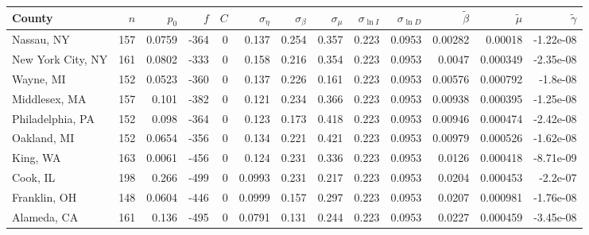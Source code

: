 \documentclass[12pt,letterpaper]{article}
\begin{document}
\begin{appendices}
\begin{sidewaystable}
{\begin{tabular}{lrrrrrrrrrrrr}
\hline
 County             &   $n$ &   $p_0$ &    $f$ &   $C$ &   $\sigma_\eta$ &   $\sigma_\beta$ &   $\sigma_\mu$ &   $\sigma_{\ln I}$ &   $\sigma_{\ln D}$ &   $\tilde{\beta}$ &   $\tilde{\mu}$ &   $\tilde\gamma$ \\
\hline
 Nassau, NY         & 157   & 0.0759  & -364   &     0 &          0.137  &           0.254  &         0.357  &              0.223 &             0.0953 &           0.00282 &        0.00018  &       -1.22e-08  \\
 New York City, NY  & 161   & 0.0802  & -333   &     0 &          0.158  &           0.216  &         0.354  &              0.223 &             0.0953 &           0.0047  &        0.000349 &       -2.35e-08  \\
 Wayne, MI          & 152   & 0.0523  & -360   &     0 &          0.137  &           0.226  &         0.161  &              0.223 &             0.0953 &           0.00576 &        0.000792 &       -1.8e-08   \\
 Middlesex, MA      & 157   & 0.101   & -382   &     0 &          0.121  &           0.234  &         0.366  &              0.223 &             0.0953 &           0.00938 &        0.000395 &       -1.25e-08  \\
 Philadelphia, PA   & 152   & 0.098   & -364   &     0 &          0.123  &           0.173  &         0.418  &              0.223 &             0.0953 &           0.00946 &        0.000474 &       -2.42e-08  \\
 Oakland, MI        & 152   & 0.0654  & -356   &     0 &          0.134  &           0.221  &         0.421  &              0.223 &             0.0953 &           0.00979 &        0.000526 &       -1.62e-08  \\
 King, WA           & 163   & 0.0061  & -456   &     0 &          0.124  &           0.231  &         0.336  &              0.223 &             0.0953 &           0.0126  &        0.000418 &       -8.71e-09  \\
 Cook, IL           & 198   & 0.266   & -499   &     0 &          0.0993 &           0.231  &         0.217  &              0.223 &             0.0953 &           0.0204  &        0.000453 &       -2.2e-07   \\
 Franklin, OH       & 148   & 0.0604  & -446   &     0 &          0.0999 &           0.157  &         0.297  &              0.223 &             0.0953 &           0.0207  &        0.000981 &       -1.76e-08  \\
 Alameda, CA        & 161   & 0.136   & -495   &     0 &          0.0791 &           0.131  &         0.244  &              0.223 &             0.0953 &           0.0227  &        0.000459 &       -3.45e-08  \\

\end{tabular}}
\end{sidewaystable}
\end{appendices}
\end{document}

